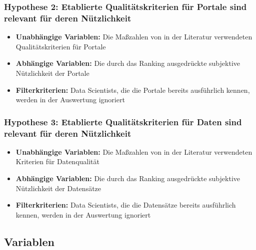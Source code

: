 \documentclass[a4paper,10pt,german,public]{INSOexpose}
\begin{document}
\subsubsection{Hypothese 2: Etablierte Qualitätskriterien für Portale sind relevant für deren Nützlichkeit}

\begin{itemize}
    \item \textbf{Unabhängige Variablen:} Die Maßzahlen von
    in der Literatur verwendeten Qualitätskriterien für Portale
    \item \textbf{Abhängige Variablen:} Die durch das Ranking ausgedrückte
    subjektive Nützlichkeit der Portale
    \item \textbf{Filterkriterien:} Data Scientists, die die Portale
    bereits ausführlich kennen, werden in der Auswertung ignoriert
\end{itemize}

\subsubsection{Hypothese 3: Etablierte Qualitätskriterien für Daten sind relevant für deren Nützlichkeit}

\begin{itemize}
    \item \textbf{Unabhängige Variablen:} Die Maßzahlen von
    in der Literatur verwendeten Kriterien für Datenqualität
    \item \textbf{Abhängige Variablen:} Die durch das Ranking ausgedrückte
    subjektive Nützlichkeit der Datensätze
    \item \textbf{Filterkriterien:} Data Scientists, die die Datensätze
    bereits ausführlich kennen, werden in der Auswertung ignoriert
\end{itemize}

\subsection{Variablen}

\end{document}
